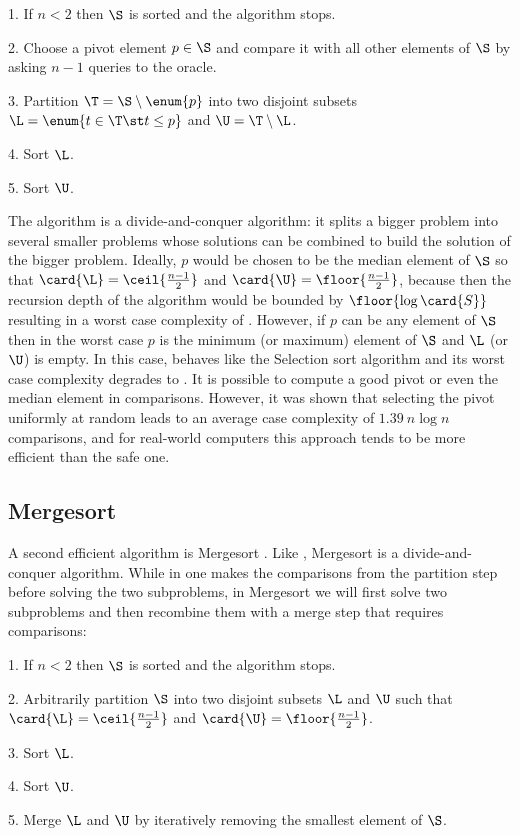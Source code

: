 \begin{algorithm}
\item[1.] If \(n < 2\) then \(\S\) is sorted and the algorithm stops.
\item[2.] Choose a pivot element \(p \in \S\) and compare it with all other
elements of \(\S\) by asking \(n - 1\) queries to the oracle.
\item[3.] Partition \(\T = \S \setminus \enum{p}\) into two disjoint subsets
\(\L = \enum{t \in \T \st t \le p}\) and \(\U = \T \setminus \L\).
\item[4.] Sort \(\L\).
\item[5.] Sort \(\U\).
\end{algorithm}

The \quicksort algorithm is a divide-and-conquer algorithm: it splits a
bigger problem into several smaller problems whose solutions can be combined
to build the solution of the bigger problem. Ideally, \(p\) would be chosen to
be the median element of \(\S\) so that \(\card{\L} =
\ceil{\frac{n-1}{2}}\) and \(\card{\U} =
\floor{\frac{n-1}{2}}\), because then the recursion depth of the
algorithm would be bounded by \(\floor{\log \card{S}}\) resulting in a worst
case complexity of . However, if \(p\) can be any element of
\(\S\) then in the worst case \(p\) is the minimum (or maximum) element of
\(\S\) and \(\L\) (or \(\U\)) is empty. In this case, \quicksort behaves like
the Selection sort algorithm and its worst case complexity degrades to
. It is possible \cite{blum:1973} to compute a good pivot or even the
median element in  comparisons. However, it was shown \cite{hoare:1962} that
selecting the pivot uniformly at random leads to an average case complexity of
\(1.39~n \log n\) comparisons, and for real-world computers this approach tends
to be more efficient than the safe one.

\subsection*{Mergesort}

A second efficient algorithm is Mergesort
\cite{goldstine:1948,leiserson:2001}. Like \quicksort, Mergesort is a
divide-and-conquer algorithm. While in \quicksort one makes the comparisons from
the partition step before solving the two subproblems, in Mergesort we will
first solve two subproblems and then recombine them with a merge step that
requires  comparisons:

\begin{algorithm}
\item[1.] If \(n < 2\) then \(\S\) is sorted and the algorithm stops.
\item[2.] Arbitrarily partition \(\S\) into two disjoint subsets \(\L\) and
\(\U\) such that \(\card{\L} = \ceil{\frac{n-1}{2}}\) and \(\card{\U} =
\floor{\frac{n-1}{2}}\).
\item[3.] Sort \(\L\).
\item[4.] Sort \(\U\).
\item[5.] Merge \(\L\) and \(\U\) by iteratively removing the smallest element
of \(\S\).
\end{algorithm}

